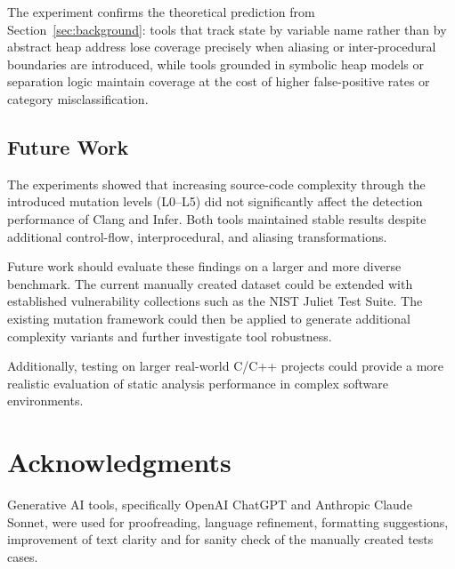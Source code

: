 \documentclass[11pt,a4paper]{article}
\begin{document}
The experiment confirms the theoretical prediction from Section~\ref{sec:background}:
tools that track state by variable name rather than by abstract heap address lose
coverage precisely when aliasing or inter-procedural boundaries are introduced, while
tools grounded in symbolic heap models or separation logic maintain coverage at the
cost of higher false-positive rates or category misclassification.

\subsection{Future Work}

The experiments showed that increasing source-code complexity through the
introduced mutation levels (L0--L5) did not significantly affect the detection
performance of Clang and Infer. Both tools maintained stable results despite
additional control-flow, interprocedural, and aliasing transformations.

Future work should evaluate these findings on a larger and more diverse
benchmark. The current manually created dataset could be extended with
established vulnerability collections such as the NIST Juliet Test Suite. The
existing mutation framework could then be applied to generate additional
complexity variants and further investigate tool robustness.

Additionally, testing on larger real-world C/C++ projects could provide a more
realistic evaluation of static analysis performance in complex software
environments.





\section*{Acknowledgments}

Generative AI tools, specifically OpenAI ChatGPT and Anthropic Claude Sonnet, were used for proofreading, language refinement, formatting suggestions, improvement of text clarity and for sanity check of the manually created tests cases.




	      
\end{document}
